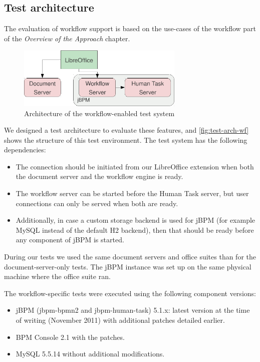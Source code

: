 \subsection*{Test architecture}

The evaluation of workflow support is based on the use-cases of the workflow
part of the \emph{Overview of the Approach} chapter.

\begin{figure}[H]
\centering
\includegraphics[width=300px,keepaspectratio]{test-arch-wf.pdf}
\caption{Architecture of the workflow-enabled test system}
\label{fig:test-arch-wf}
\end{figure}

We designed a test architecture to evaluate these features, and
\autoref{fig:test-arch-wf} shows the structure of this test environment. The
test system has the following dependencies:

\begin{itemize}
\item The connection should be initiated from our LibreOffice extension when
both the document server and the workflow engine is ready.
\item The workflow server can be started before the Human Task server, but user
connections can only be served when both are ready.
\item Additionally, in case a custom storage backend is used for jBPM (for
example MySQL instead of the default H2 backend), then that should be ready
before any component of jBPM is started.
\end{itemize}

During our tests we used the same document servers and office suites than for
the document-server-only tests. The jBPM instance was set up on the same
physical machine where the office suite ran.

The workflow-specific tests were executed using the following component versions:

\begin{itemize}
\item jBPM (jbpm-bpmn2 and jbpm-human-task) 5.1.x: latest version at the time
of writing (November 2011) with additional patches detailed earlier.
\item BPM Console 2.1 with the patches.
\item MySQL 5.5.14 without additional modifications.
\end{itemize}


